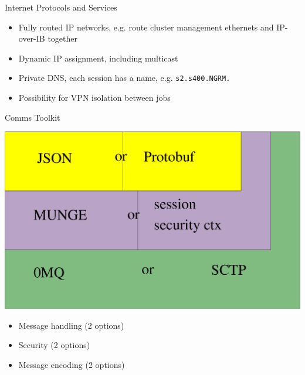 \documentclass[default,pdf,colorBG,slideColor]{prosper}
\newcommand{\ngrm}{NGRM}
\begin{document}
\begin{slide}{Internet Protocols and Services}{\small
\begin{itemize}
  \item{Fully routed IP networks, e.g. route cluster management
	ethernets and IP-over-IB together}
  \item{Dynamic IP assignment, including multicast}
  \item{Private DNS, each session has a name, e.g. {\tt s2.s400.\ngrm.}}
  \item{Possibility for VPN isolation between jobs}
\end{itemize}
}\end{slide}
\begin{slide}{Comms Toolkit}{\small
\begin{center}
  \includegraphics[scale=0.20]{commstk}
\end{center}
\begin{itemize}
  \item{Message handling (2 options)}
  \item{Security (2 options)}
  \item{Message encoding (2 options)}
\end{itemize}
}\end{slide}
\end{document}
